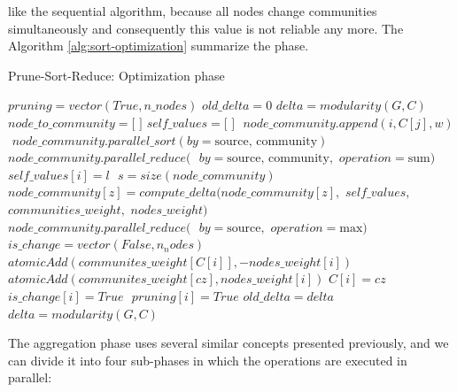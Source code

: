 like the sequential algorithm, because all nodes change communities simultaneously and consequently this value is not reliable any more.
The Algorithm \ref{alg:sort-optimization} summarize the phase.
\begin{algorithm}
	\caption{Prune-Sort-Reduce: Optimization phase}\label{alg:sort-optimization}
\begin{algorithmic}
	\State $pruning = vector(True, n\_nodes)$
	\State $old\_delta = 0$
	\State $delta = modularity(G,C)$
		\State $node\_to\_community = \text{[ ]}$
		\State $self\_values = \text{[ ]}$
		\State $ $
				\State $node\_community.append(i,C[j],w)$
			\EndIf
		\EndFor 
		\State $ $
		\State $node\_community.parallel\_sort(by= \text{source, community})$
		\State $ $
		\State $node\_community.parallel\_reduce(\text{ }by= \text{source, community}, $
		\Statex[12] $operation= \text{sum})$
		\State $ $
			\State $self\_values[i] = l$
		\EndIf
		\EndFor
		\State $ $
		\State $s = size(node\_community)$
			\State $node\_community[z] = compute\_delta(node\_community[z],$ 
			\Statex[14] $self\_values,$ 
			\Statex[14] $communities\_weight,$
			\Statex[14] $nodes\_weight)$
		\EndFor
		\State $ $
		\State $node\_community.parallel\_reduce(\text{ }by= \text{source},$
		\Statex[9] $operation= \text{max})$
		\State $ $
		\State $is\_change = vector(False, n_nodes)$
				\State $atomicAdd(communites\_weight[C[i]], -nodes\_weight[i])$
				\State $atomicAdd(communites\_weight[cz], nodes\_weight[i])$
				\State $C[i] = cz$
				\State $is\_change[i] = True$
			\EndIf
		\EndFor
		\State $ $
				\State $pruning[i] = True$
			\EndIf
		\EndFor
		\State $old\_delta = delta$
		\State $delta = modularity(G,C)$
	\EndWhile
	\EndProcedure
	\end{algorithmic}
\end{algorithm}\newpage
\noindent The aggregation phase uses several similar concepts presented previously, and we can divide it into four sub-phases in which the operations are executed in parallel:
